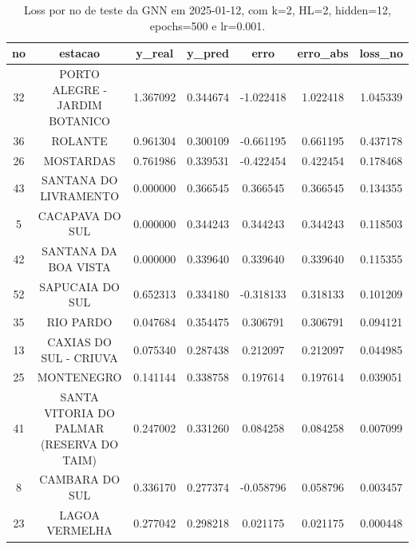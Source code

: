 \begin{table}[h]
\centering
\caption{Loss por no de teste da GNN em 2025-01-12, com k=2, HL=2, hidden=12, epochs=500 e lr=0.001.}
\label{tab:gnn_loss_k2_hl2_h12_e500_d20250112}
\begin{tabular}{ccccccc}
\toprule
no & estacao & y\_real & y\_pred & erro & erro\_abs & loss\_no \\
\midrule
32 & PORTO ALEGRE - JARDIM BOTANICO & 1.367092 & 0.344674 & -1.022418 & 1.022418 & 1.045339 \\
36 & ROLANTE & 0.961304 & 0.300109 & -0.661195 & 0.661195 & 0.437178 \\
26 & MOSTARDAS & 0.761986 & 0.339531 & -0.422454 & 0.422454 & 0.178468 \\
43 & SANTANA DO LIVRAMENTO & 0.000000 & 0.366545 & 0.366545 & 0.366545 & 0.134355 \\
5 & CACAPAVA DO SUL & 0.000000 & 0.344243 & 0.344243 & 0.344243 & 0.118503 \\
42 & SANTANA DA BOA VISTA & 0.000000 & 0.339640 & 0.339640 & 0.339640 & 0.115355 \\
52 & SAPUCAIA DO SUL & 0.652313 & 0.334180 & -0.318133 & 0.318133 & 0.101209 \\
35 & RIO PARDO & 0.047684 & 0.354475 & 0.306791 & 0.306791 & 0.094121 \\
13 & CAXIAS DO SUL - CRIUVA & 0.075340 & 0.287438 & 0.212097 & 0.212097 & 0.044985 \\
25 & MONTENEGRO & 0.141144 & 0.338758 & 0.197614 & 0.197614 & 0.039051 \\
41 & SANTA VITORIA DO PALMAR (RESERVA DO TAIM) & 0.247002 & 0.331260 & 0.084258 & 0.084258 & 0.007099 \\
8 & CAMBARA DO SUL & 0.336170 & 0.277374 & -0.058796 & 0.058796 & 0.003457 \\
23 & LAGOA VERMELHA & 0.277042 & 0.298218 & 0.021175 & 0.021175 & 0.000448 \\
\bottomrule
\end{tabular}
\end{table}
